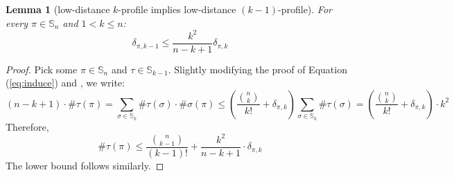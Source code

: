 \documentclass{article}
\newtheorem{lemma}[theorem]{Lemma}
\newcommand{\Sn}{\mathbb{S}_n}
\newcommand{\pc}[2]{{\# \mathtt{ #1 } \left( #2 \right)}}
\theoremstyle{remark}
\theoremstyle{plain}
\begin{document}
\begin{lemma}[low-distance $k$-profile implies low-distance $(k-1)$-profile]
    \label{lemma:kclose_implies_lt_k_close}
    For every $\pi \in \Sn$ and $1 < k \le n$:
    \[
        \delta_{\pi,k-1} \leq \frac{k^2}{n-k+1} \delta_{\pi,k}
    \]
\end{lemma}
\begin{proof}
Pick some $\pi \in \Sn$ and $\tau\in\mathbb{S}_{k-1}$.
Slightly modifying the proof of Equation (\ref{eq:induce}) and , we write:
    \[
        (n-k+1) \cdot \pc{\tau}{\pi} = \sum_{\sigma\in\mathbb{S}_k} \pc{\tau}{\sigma} \cdot \pc{\sigma}{\pi} \leq \left(\frac{\binom{n}{k}}{k!} + \delta_{\pi,k} \right)\sum_{\sigma\in\mathbb{S}_k} \pc{\tau}{\sigma} = \left(\frac{\binom{n}{k}}{k!} + \delta_{\pi,k} \right)\cdot k^2
    \]
    Therefore,
    \[
        \pc{\tau}{\pi} \leq \frac{\binom{n}{k-1}}{(k-1)!} + \frac{k^2}{n-k+1}\cdot \delta_{\pi,k}
    \]
    The lower bound follows similarly.
\end{proof}
\end{document}
